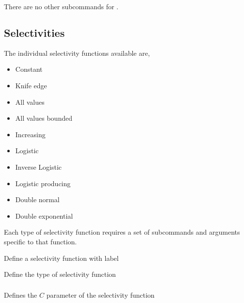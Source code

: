 There are no other subcommands for .

\subsubsection[Basic]{}

\TOUNDOend

\subsection{Selectivities}

The individual selectivity functions available are,

\begin{itemize}
	\item Constant
	\item Knife edge
	\item All values
	\item All values bounded
	\item Increasing
	\item Logistic
	\item Inverse Logistic
	\item Logistic producing
	\item Double normal
	\item Double exponential
\end{itemize}

Each type of selectivity function requires a set of subcommands and arguments specific to that function.

 {Define a selectivity function with label}

 {Define the type of selectivity function}

\subsubsection[Constant]{}

 {Defines the $C$ parameter of the selectivity function}

\subsubsection[Knife-edge]{}

